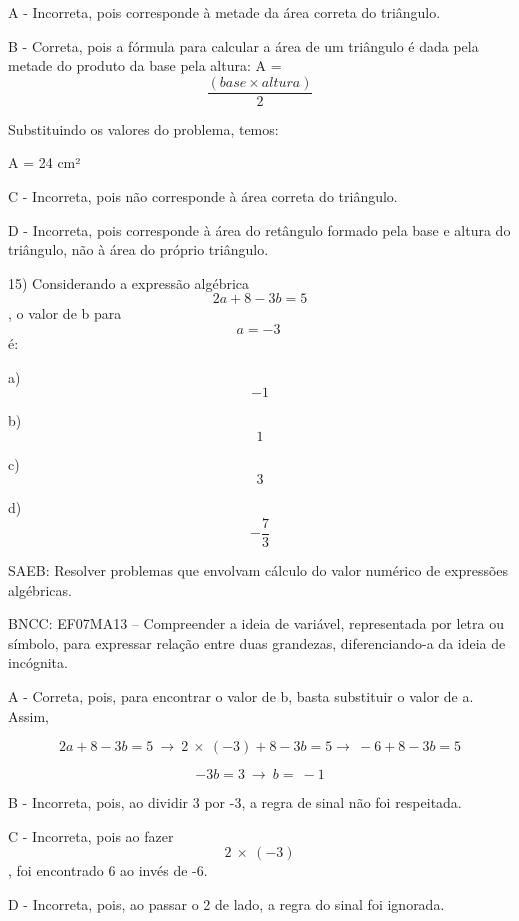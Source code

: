A - Incorreta, pois corresponde à metade da área correta do triângulo.

B - Correta, pois a fórmula para calcular a área de um triângulo é dada
pela metade do produto da base pela altura: A =
\[\frac {(base \times altura)}{2}\]

Substituindo os valores do problema, temos:

A = 24 cm²

C - Incorreta, pois não corresponde à área correta do triângulo.

D - Incorreta, pois corresponde à área do retângulo formado pela base e
altura do triângulo, não à área do próprio triângulo.

15) Considerando a expressão algébrica \[2a + 8 - 3b = 5\], o valor de b
para \[a = - 3\ \]é:

a) \[- 1\]

b) \[1\]

c) \[3\]

d) \[- \frac{7}{3}\]

SAEB: Resolver problemas que envolvam cálculo do valor numérico de
expressões algébricas.

BNCC: EF07MA13 -- Compreender a ideia de variável, representada por
letra ou símbolo, para expressar relação entre duas grandezas,
diferenciando-a da ideia de incógnita.

A - Correta, pois, para encontrar o valor de b, basta substituir o valor
de a. Assim,

\[2a + 8 - 3b = 5\  \rightarrow \ 2\  \times \ \left( - 3 \right) + 8 - 3b = 5 \rightarrow \  - 6 + 8 - 3b = 5\]

\[- 3b = 3\  \rightarrow \ b = \  - 1\]

B - Incorreta, pois, ao dividir 3 por -3, a regra de sinal não foi
respeitada.

C - Incorreta, pois ao fazer \[2\  \times \ \left( - 3 \right)\], foi
encontrado 6 ao invés de -6.

D - Incorreta, pois, ao passar o 2 de lado, a regra do sinal foi
ignorada.
